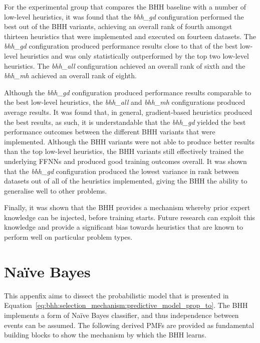 \documentclass[preprint,review,12pt]{elsarticle}
\begin{document}
For the experimental group that compares the \acs{BHH} baseline with a number of low-level heuristics, it was found that the \textit{bhh\_gd} configuration performed the best out of the \acs{BHH} variants, achieving an overall rank of fourth amongst thirteen heuristics that were implemented and executed on fourteen datasets. The \textit{bhh\_gd} configuration produced performance results close to that of the best low-level heuristics and was only statistically outperformed by the top two low-level heuristics. The \textit{bhh\_all} configuration achieved an overall rank of sixth and the \textit{bhh\_mh} achieved an overall rank of eighth.

Although the \textit{bhh\_gd} configuration produced performance results comparable to the best low-level heuristics, the \textit{bhh\_all} and \textit{bhh\_mh} configurations produced average results. It was found that, in general, gradient-based heuristics produced the best results, as such, it is understandable that the \textit{bhh\_gd} yielded the best performance outcomes between the different \acs{BHH} variants that were implemented. Although the \acs{BHH} variants were not able to produce better results than the top low-level heuristics, the \acs{BHH} variants still effectively trained the underlying \acp{FFNN} and produced good training outcomes overall. It was shown that the \textit{bhh\_gd} configuration produced the lowest variance in rank between datasets out of all of the heuristics implemented, giving the \acs{BHH} the ability to generalise well to other problems.

Finally, it was shown that the \acs{BHH} provides a mechanism whereby prior expert knowledge can be injected, before training starts. Future research can exploit this knowledge and provide a significant bias towards heuristics that are known to perform well on particular problem types.

\appendix

\section{Naïve Bayes}
\label{app:naive_bayes}

This appenfix aims to dissect the probabilistic model that is presented in Equation~\eqref{eq:bhh:selection_mechanism:predictive_model_prop_to}. The \acs{BHH} implements a form of Naïve Bayes classifier, and thus independence between events can be assumed. The following derived \acp{PMF} are provided as fundamental building blocks to show the mechanism by which the \acs{BHH} learns.
\end{document}
